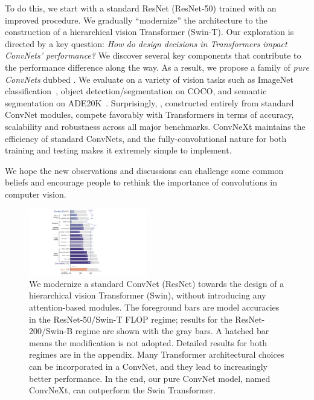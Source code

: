 \documentclass[10pt,twocolumn,letterpaper]{article}
\begin{document}
To do this, we start with a standard ResNet (\eg ResNet-50) trained with an improved procedure. We gradually ``modernize'' the architecture to the construction of a hierarchical vision Transformer (\eg Swin-T). Our exploration is directed by a key question: \emph{How do design decisions in Transformers impact ConvNets' performance?} We discover several key components that contribute to the performance difference along the way. As a result, we propose a family of \textit{pure ConvNets} dubbed \cnn{}. 
We evaluate  on a variety of vision tasks such as ImageNet classification~\cite{Deng2009}, object detection/segmentation on COCO\cite{Lin2014}, and semantic segmentation on ADE20K~\cite{Zhou2019}. Surprisingly, , constructed entirely from standard ConvNet modules, compete favorably with Transformers in terms of accuracy, scalability and robustness across all major benchmarks. 
ConvNeXt maintains the efficiency of standard ConvNets, and the fully-convolutional nature for both training and testing makes it extremely simple to implement.

We hope the new observations and discussions can challenge some common beliefs and encourage people to rethink the importance of convolutions in computer vision.

\begin{figure}[t] 
\centering
\includegraphics[width=0.46\textwidth]{figs/morph_main_v3}
\vspace{-.8em}
\caption{We modernize a standard ConvNet (ResNet) towards the design of a hierarchical vision Transformer (Swin), without introducing any attention-based modules. The foreground bars are model accuracies in the ResNet-50/Swin-T FLOP regime; results for the ResNet-200/Swin-B regime are shown with the gray bars. A hatched bar means the modification is not adopted. Detailed results for both regimes are in the appendix. Many Transformer architectural choices can be incorporated in a ConvNet, and they lead to increasingly better performance. In the end, our pure ConvNet model, named ConvNeXt, can outperform the Swin Transformer.}
\label{fig:morph_main}\vspace{-1.5em}
\end{figure}
\end{document}
